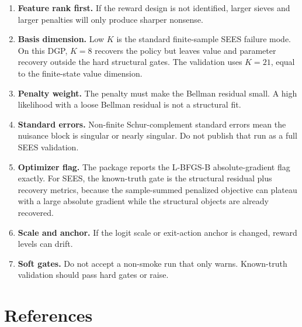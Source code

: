 \documentclass[10pt]{article}
\begin{document}
\begin{enumerate}
\item \textbf{Feature rank first.} If the reward design is not identified,
larger sieves and larger penalties will only produce sharper nonsense.
\item \textbf{Basis dimension.} Low \(K\) is the standard finite-sample SEES
failure mode. On this DGP, \(K=8\) recovers the policy but leaves value and
parameter recovery outside the hard structural gates. The validation uses
\(K=21\), equal to the finite-state value dimension.
\item \textbf{Penalty weight.} The penalty must make the Bellman residual
small. A high likelihood with a loose Bellman residual is not a structural
fit.
\item \textbf{Standard errors.} Non-finite Schur-complement standard errors
mean the nuisance block is singular or nearly singular. Do not publish that
run as a full SEES validation.
\item \textbf{Optimizer flag.} The package reports the L-BFGS-B
absolute-gradient flag exactly. For SEES, the known-truth gate is the
structural residual plus recovery metrics, because the sample-summed
penalized objective can plateau with a large absolute gradient while the
structural objects are already recovered.
\item \textbf{Scale and anchor.} If the logit scale or exit-action anchor is
changed, reward levels can drift.
\item \textbf{Soft gates.} Do not accept a non-smoke run that only warns.
Known-truth validation should pass hard gates or raise.
\end{enumerate}

\section{References}



\end{document}
